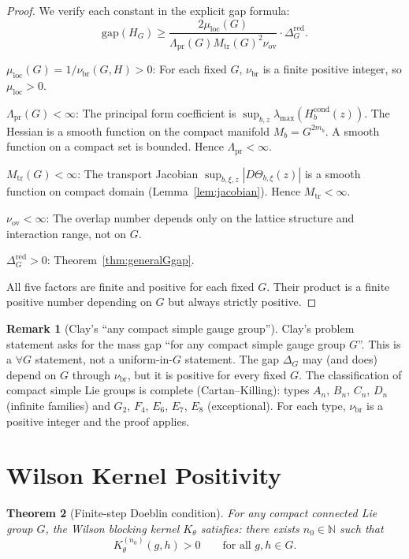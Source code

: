 \documentclass[12pt]{article}
\theoremstyle{plain}
\newtheorem{theorem}{Theorem}[section]
\theoremstyle{definition}
\newtheorem{remark}[theorem]{Remark}
\numberwithin{equation}{section}
\newcommand{\N}{\mathbb{N}}
\newcommand{\pr}{\mathrm{pr}}
\newcommand{\loc}{\mathrm{loc}}
\newcommand{\red}{\mathrm{red}}
\newcommand{\br}{\mathrm{br}}
\newcommand{\ov}{\mathrm{ov}}
\newcommand{\tr}{\mathrm{tr}}
\begin{document}
\begin{proof}
We verify each constant in the explicit gap formula:
\begin{equation}
\mathrm{gap}(H_G) \geq \frac{2\mu_{\loc}(G)}{\Lambda_{\pr}(G)M_{\tr}(G)^2\nu_{\ov}}\cdot\Delta_G^{\red}.
\end{equation}

\emph{$\mu_{\loc}(G)=1/\nu_{\br}(G,H)>0$}: For each fixed $G$, $\nu_{\br}$ is a finite positive integer, so $\mu_{\loc}>0$.

\emph{$\Lambda_{\pr}(G)<\infty$}: The principal form coefficient is $\sup_{b,z}\lambda_{\max}(H_b^{\mathrm{cond}}(z))$.  The Hessian is a smooth function on the compact manifold $M_b=G^{2m_b}$.  A smooth function on a compact set is bounded.  Hence $\Lambda_{\pr}<\infty$.

\emph{$M_{\tr}(G)<\infty$}: The transport Jacobian $\sup_{b,\xi,z}|D\Theta_{b,\xi}(z)|$ is a smooth function on compact domain (Lemma~\ref{lem:jacobian}).  Hence $M_{\tr}<\infty$.

\emph{$\nu_{\ov}<\infty$}: The overlap number depends only on the lattice structure and interaction range, not on $G$.

\emph{$\Delta_G^{\red}>0$}: Theorem~\ref{thm:generalGgap}.

All five factors are finite and positive for each fixed $G$.  Their product is a finite positive number depending on $G$ but always strictly positive.
\end{proof}

\begin{remark}[Clay's ``any compact simple gauge group'']
Clay's problem statement asks for the mass gap ``for any compact simple gauge group $G$''.  This is a $\forall G$ statement, not a uniform-in-$G$ statement.  The gap $\Delta_G$ may (and does) depend on $G$ through $\nu_{\br}$, but it is positive for every fixed $G$.  The classification of compact simple Lie groups is complete (Cartan--Killing): types $A_n$, $B_n$, $C_n$, $D_n$ (infinite families) and $G_2$, $F_4$, $E_6$, $E_7$, $E_8$ (exceptional).  For each type, $\nu_{\br}$ is a positive integer and the proof applies.
\end{remark}


\section{Wilson Kernel Positivity}\label{sec:doeblin}

\begin{theorem}[Finite-step Doeblin condition]\label{thm:doeblin}
For any compact connected Lie group $G$, the Wilson blocking kernel $K_\theta$ satisfies: there exists $n_0\in\N$ such that
\begin{equation}
K_\theta^{(n_0)}(g,h) > 0\qquad\text{for all }g,h\in G.
\end{equation}
\end{theorem}
\end{document}
